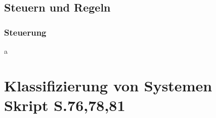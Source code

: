 \documentclass[margin=normal]{tex/hsrzf}
\newcommand{\tiltewithref}[2]{\texorpdfstring{#1 {\scriptsize \color{RefColor}Skript S.#2}}{#1}}
\begin{document}
\subsection{Steuern und Regeln}
\begin{minipage}{0.5\textwidth}
      \subsubsection*{Steuerung}

\end{minipage}%
\begin{minipage}{0.5\textwidth}
    a  
\end{minipage}





\section{\tiltewithref{Klassifizierung von Systemen}{76,78,81}}
\end{document}
